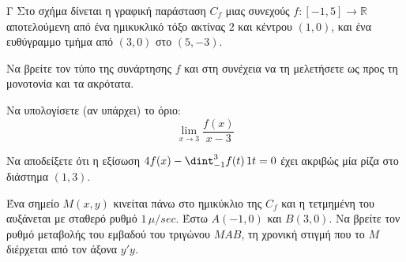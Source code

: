 \begin{thema}{Γ}
Στο σχήμα δίνεται η γραφική παράσταση $C_f$ μιας συνεχούς $f:[-1, 5]\to\mathbb{R}$ αποτελούμενη από ένα ημικυκλικό τόξο ακτίνας $2$ και κέντρου $(1, 0)$, και ένα ευθύγραμμο τμήμα από $(3, 0)$ στο $(5, -3)$.

\begin{center}
\end{center}

\begin{erwthma}
  \item Να βρείτε τον τύπο της συνάρτησης $f$ και στη συνέχεια να τη μελετήσετε ως προς τη μονοτονία και τα ακρότατα.
  \item Να υπολογίσετε (αν υπάρχει) το όριο:
  \[ \lim\limits_{x \to 3} \dfrac{f(x)}{x-3} \]
  \item Να αποδείξετε ότι η εξίσωση $4f(x) - \dint_{-1}^3 f(t)\,\d t = 0$ έχει ακριβώς μία ρίζα στο διάστημα $(1, 3)$.
  \item Ένα σημείο $M(x, y)$ κινείται πάνω στο ημικύκλιο της $C_f$ και η τετμημένη του αυξάνεται με σταθερό ρυθμό $1\,\mu/\si{sec}$. Έστω $A(-1, 0)$ και $B(3, 0)$. Να βρείτε τον ρυθμό μεταβολής του εμβαδού του τριγώνου $MAB$, τη χρονική στιγμή που το $M$ διέρχεται από τον άξονα $y'y$.
\end{erwthma}
\end{thema}


